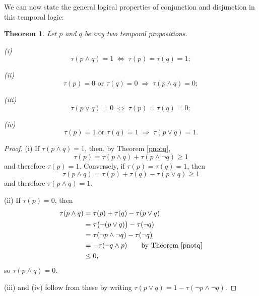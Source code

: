 \documentclass[12pt,reqno]{article}
\newcommand{\semilinespace}{\vspace{0.5\baselineskip}}
\newcommand{\upline}{\vspace{-1.2\abovedisplayskip}}
\renewcommand{\(}{\left(}
\renewcommand{\)}{\right)}
\newcommand{\<}{\langle}
\renewcommand{\>}{\rangle}
\newcommand{\impl}{\Longrightarrow}
\theoremstyle{plain} %
\newtheorem{thm}{Theorem}
\begin{document}
We can now state the general logical properties of conjunction and disjunction in this temporal logic:

\begin{thm} \label{truth}
Let $p$ and $q$ be any two temporal propositions. 

\semilinespace

\emph{(i)}\upline
\[
\tau(p\land q) = 1 \; \iff \; \tau(p) = \tau(q) = 1;
\]

\emph{(ii)}\upline
\[
\tau(p) = 0 \text{ or } \tau(q) = 0 \;\impl\; \tau(p\land q) = 0;
\]

\emph{(iii)}\upline
\[
\tau(p\lor q) = 0 \;\iff\; \tau(p) = \tau(q) = 0;
\]

\emph{(iv)}\upline
\[
\tau(p) = 1 \text{ or } \tau(q) = 1 \;\impl\; \tau(p\lor q) = 1.
\]
\end{thm}
\begin{proof}
\noindent (i) If $\tau(p\land q) = 1$, then, by Theorem \ref{pnotq},
\[
\tau(p) = \tau(p\land q) + \tau(p\land\lnot q) \ge 1
\]
and therefore $\tau(p) = 1$. Conversely, if $\tau(p) = \tau(q) = 1$, then 
\[
\tau(p\land q) = \tau(p) + \tau(q) - \tau(p\lor q) \ge 1
\]
and therefore $\tau(p\land q) = 1$.

\semilinespace

\noindent (ii) If $\tau(p) = 0$, then
\begin{align*}
\tau(p\land q) &= \tau(p) + \tau(q) - \tau(p\lor q)\\
&= \tau\big(\lnot(p\lor q)\big) - \tau(\lnot q)\\
&= \tau(\lnot p \land \lnot q) - \tau(\lnot q)\\
&= -\tau(\lnot q\land p) \qquad \text{by Theorem \ref{pnotq}}\\
&\le 0,
\end{align*}
so $\tau(p\land q) = 0$.

\semilinespace

(iii) and (iv) follow from these by writing $\tau(p\lor q) = 1 - \tau(\lnot p\land \lnot q)$. 
\end{proof}
\end{document}
